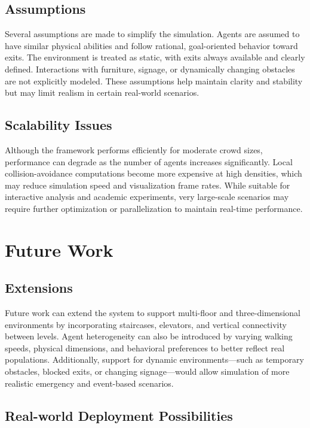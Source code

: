 \documentclass[conference]{IEEEtran}
\begin{document}
\subsection{\textbf{Assumptions}}

Several assumptions are made to simplify the simulation. Agents are assumed to
have similar physical abilities and follow rational, goal-oriented behavior
toward exits. The environment is treated as static, with exits always available
and clearly defined. Interactions with furniture, signage, or dynamically
changing obstacles are not explicitly modeled. These assumptions help maintain
clarity and stability but may limit realism in certain real-world scenarios.

\subsection{\textbf{Scalability Issues}}

Although the framework performs efficiently for moderate crowd sizes,
performance can degrade as the number of agents increases significantly. Local
collision-avoidance computations become more expensive at high densities, which
may reduce simulation speed and visualization frame rates. While suitable for
interactive analysis and academic experiments, very large-scale scenarios may
require further optimization or parallelization to maintain real-time
performance.

\section{Future Work}

\subsection{\textbf{Extensions}}

Future work can extend the system to support multi-floor and three-dimensional
environments by incorporating staircases, elevators, and vertical connectivity
between levels. Agent heterogeneity can also be introduced by varying walking
speeds, physical dimensions, and behavioral preferences to better reflect real
populations. Additionally, support for dynamic environments—such as temporary
obstacles, blocked exits, or changing signage—would allow simulation of more
realistic emergency and event-based scenarios.

\subsection{\textbf{Real-world Deployment Possibilities}}
\end{document}
